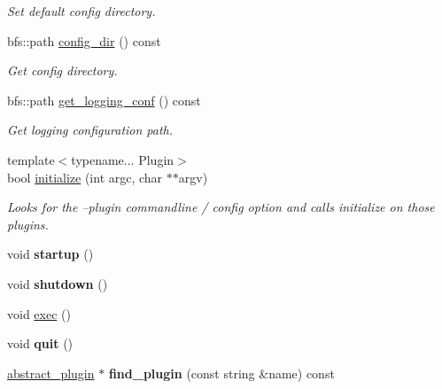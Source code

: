 \begin{DoxyCompactItemize}
\begin{DoxyCompactList}\small\item\em Set default config directory. \end{DoxyCompactList}\item 
bfs\+::path \mbox{\hyperlink{classappbase_1_1application_a9b2c99749c7209e218a3dbbe51cfdeac}{config\+\_\+dir}} () const
\begin{DoxyCompactList}\small\item\em Get config directory. \end{DoxyCompactList}\item 
bfs\+::path \mbox{\hyperlink{classappbase_1_1application_a9abb5f5858e4dc6ba3ba45071ffdaed5}{get\+\_\+logging\+\_\+conf}} () const
\begin{DoxyCompactList}\small\item\em Get logging configuration path. \end{DoxyCompactList}\item 
{\footnotesize template$<$typename... Plugin$>$ }\\bool \mbox{\hyperlink{classappbase_1_1application_a29ed51314f78ebe6795930a4ca910fd6}{initialize}} (int argc, char $\ast$$\ast$argv)
\begin{DoxyCompactList}\small\item\em Looks for the --plugin commandline / config option and calls initialize on those plugins. \end{DoxyCompactList}\item 
\mbox{\label{classappbase_1_1application_a3b77bd811744da79c9d8ba0d078e7668}} 
void {\bfseries startup} ()
\item 
\mbox{\label{classappbase_1_1application_a116e20109f980460cf8c38e349766bcc}} 
void {\bfseries shutdown} ()
\item 
void \mbox{\hyperlink{classappbase_1_1application_a39286b0b034b97f6940568a00f44edaf}{exec}} ()
\item 
\mbox{\label{classappbase_1_1application_a81aa58d3f94570b7976145039155fc46}} 
void {\bfseries quit} ()
\item 
\mbox{\label{classappbase_1_1application_a1d2c585f90007be342c9c64ee9cc0f7c}} 
\mbox{\hyperlink{classappbase_1_1abstract__plugin}{abstract\+\_\+plugin}} $\ast$ {\bfseries find\+\_\+plugin} (const string \&name) const
$$
\end{DoxyCompactItemize}
